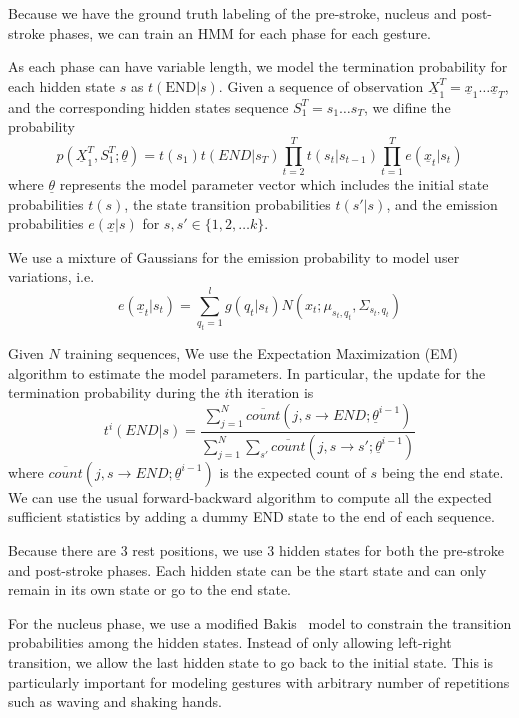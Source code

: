 \documentclass{acm_proc_article-sp}
\begin{document}
Because we have the ground truth labeling of the pre-stroke, nucleus and post-stroke phases, 
we can train an HMM for each phase for each gesture. 

As each phase can have variable length, we model the termination probability for each
hidden state $s$ as $t(\text{END}|s)$. Given a sequence of observation $\underline{X}_1^T = \underline{x}_1\ldots\underline{x}_T$, and 
the corresponding hidden states sequence $S_1^T = s_1\ldots s_T$, we difine the probability
\begin{displaymath}
p(\underline{X}_1^T, S_1^T;\underline{\theta}) = 
    t(s_1)t(END|s_T)\prod_{t = 2}^T t(s_t | s_{t-1})\prod_{t = 1}^T e(\underline{x}_t|s_t)
\end{displaymath}
where $\underline{\theta}$ represents the model parameter vector which includes
the initial state probabilities $t(s)$, the state transition probabilities $t(s'|s)$, and the 
emission probabilities $e(\underline{x}|s)$ for $s, s'\in \{1, 2,\ldots k\}$. 

We use a mixture of Gaussians for the emission probability to model user variations, i.e.
\begin{displaymath}
e(\underline{x}_t|s_t) = \sum_{q_t = 1}^l g(q_t | s_t)N(x_t; \mu_{s_t,q_t}, \Sigma_{s_t,q_t})
\end{displaymath} 

Given $N$ training sequences, We use the Expectation Maximization (EM) algorithm to estimate the model parameters. In
particular, the update for the termination probability during the $i$th iteration is 
\begin{displaymath}
t^i(END|s) = \frac{\sum_{j = 1}^N \overline{count}(j, s\rightarrow END;\underline{\theta}^{i-1})}
    {\sum_{j = 1}^N\sum_{s'} \overline{count}(j, s\rightarrow s';\underline{\theta}^{i-1})}
\end{displaymath}
where $\overline{count}(j, s\rightarrow END;\underline{\theta}^{i-1})$ is the expected count of 
$s$ being the end state. We can use the usual forward-backward algorithm to compute all the 
expected sufficient statistics by adding a dummy END state to the end of each sequence.

Because there are 3 rest positions, we use 3 hidden states for both the pre-stroke and post-stroke phases.
Each hidden state can be the start state and can only remain in its own state or go to the end state.
 
For the nucleus phase, we use a modified Bakis~\cite{} model to constrain the transition probabilities
among the hidden states. Instead of only allowing left-right transition, we allow the last hidden state
to go back to the initial state. This is particularly important for modeling gestures with arbitrary number of
repetitions such as waving and shaking hands. 
\end{document}
